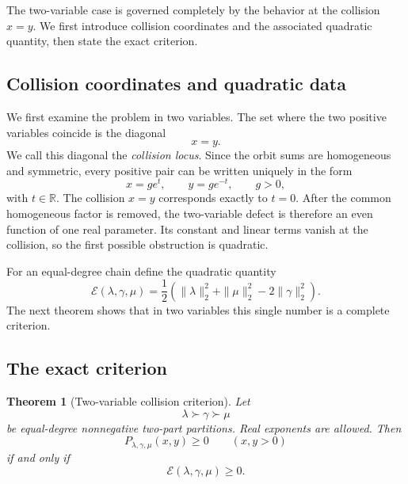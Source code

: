 \documentclass[11pt]{article}
\newtheorem{theorem}{Theorem}[section]
\theoremstyle{definition}
\newcommand{\Energy}{\mathcal E}
\begin{document}
The two-variable case is governed completely by the behavior at the collision \(x=y\).  We first introduce collision coordinates and the associated quadratic quantity, then state the exact criterion.

\subsection{Collision coordinates and quadratic data}

We first examine the problem in two variables.  The set where the two positive variables coincide is the diagonal
\begin{equation*}
x=y.
\end{equation*}
We call this diagonal the \emph{collision locus}.  Since the orbit sums are homogeneous and symmetric, every positive pair can be written uniquely in the form
\begin{equation*}
x=ge^t,
\qquad
y=ge^{-t},
\qquad
g>0,
\end{equation*}
with \(t\in\mathbb R\).  The collision \(x=y\) corresponds exactly to \(t=0\).  After the common homogeneous factor is removed, the two-variable defect is therefore an even function of one real parameter.  Its constant and linear terms vanish at the collision, so the first possible obstruction is quadratic.

For an equal-degree chain define the quadratic quantity
\begin{equation*}
\Energy(\lambda,\gamma,\mu)
=\frac12\left(
\|\lambda\|_2^2+\|\mu\|_2^2-2\|\gamma\|_2^2
\right).
\end{equation*}
The next theorem shows that in two variables this single number is a complete criterion.

\subsection{The exact criterion}

\begin{theorem}[Two-variable collision criterion]\label{thm:two-variable}
Let
\begin{equation*}
\lambda\succ\gamma\succ\mu
\end{equation*}
be equal-degree nonnegative two-part partitions.  Real exponents are allowed.  Then
\begin{equation*}
P_{\lambda,\gamma,\mu}(x,y)\ge0
\qquad(x,y>0)
\end{equation*}
if and only if
\begin{equation*}
\Energy(\lambda,\gamma,\mu)\ge0.
\end{equation*}
\end{theorem}
\end{document}
